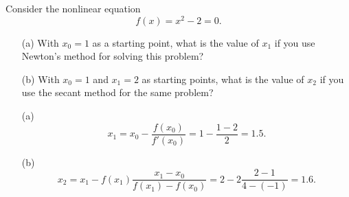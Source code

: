 \begin{pro}
  Consider the nonlinear equation
  \begin{displaymath}
    f(x) = x^2 - 2 = 0.
  \end{displaymath}
  \begin{itemize}
  \item[(a)]
    With $x_0=1$ as a starting point,
    what is the value of $x_1$ if you use Newton's method for solving this problem?

  \item[(b)]
    With $x_0=1$ and $x_1=2$ as starting points,
    what is the value of $x_2$ if you use the secant method for the same problem?
  \end{itemize}
\end{pro}

\begin{sol}
  \begin{itemize}
  \item[(a)]
    \begin{displaymath}
      x_1 = x_0 - \frac{f(x_0)}{f'(x_0)} = 1 - \frac{1-2}{2} = 1.5.
    \end{displaymath}

  \item[(b)]
    \begin{displaymath}
      x_2 = x_1 - f(x_1)\frac{x_1-x_0}{f(x_1)-f(x_0)}
    = 2 - 2 \frac{2-1}{4-(-1)} = 1.6.
    \end{displaymath}
  \end{itemize}
\end{sol}

